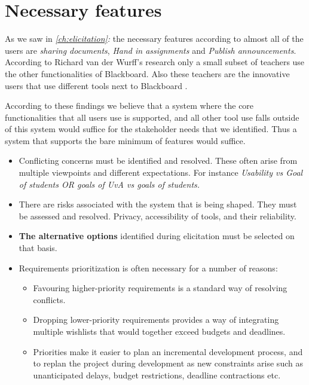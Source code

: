 \section{Necessary features}
As we saw in \emph{\ref{ch:elicitation}: } the necessary features according to almost all of the users are \emph{sharing documents}, \emph{Hand in assignments} and \emph{Publish announcements}. According to Richard van der Wurff's research only a small subset of teachers use the other functionalities of Blackboard. Also these teachers are the innovative users that use different tools next to Blackboard \cite{richard_report}. 

According to these findings we believe that a system where the core functionalities that all users use is supported, and all other tool use falls outside of this system would suffice for the stakeholder needs that we identified. Thus a system that supports the bare minimum of features would suffice.

\begin{itemize}
	\item Conflicting concerns must be identified and resolved. These often arise from multiple
	viewpoints and different expectations. For instance \textit{Usability vs Goal of students OR goals of UvA vs goals of students.}
	\item There are risks associated with the system that is being shaped. They must be assessed
	and resolved. {Privacy, accessibility of tools, and their reliability.}
	\item \textbf{The alternative options} identified during elicitation must be selected on that basis. 
	\item Requirements prioritization is often necessary for a number of reasons: 
	\begin{itemize}
		\item Favouring higher-priority requirements is a standard way of resolving conflicts.
		\item Dropping lower-priority requirements provides a way of integrating multiple wishlists
		that would together exceed budgets and deadlines.
		\item Priorities make it easier to plan an incremental development process, and to replan
		the project during development as new constraints arise such as unanticipated delays,
		budget restrictions, deadline contractions etc.
	\end{itemize}
\end{itemize}


